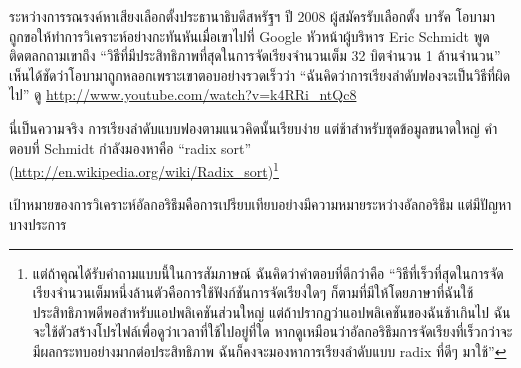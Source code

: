 ระหว่างการรณรงค์หาเสียงเลือกตั้งประธานาธิบดีสหรัฐฯ ปี 2008 ผู้สมัครรับเลือกตั้ง บารัค โอบามา ถูกขอให้ทำการวิเคราะห์อย่างกะทันหันเมื่อเขาไปที่ Google 
หัวหน้าผู้บริหาร Eric Schmidt พูดติดตลกถามเขาถึง ``วิธีที่มีประสิทธิภาพที่สุดในการจัดเรียงจำนวนเต็ม 32 บิตจำนวน 1 ล้านจำนวน'' 
เห็นได้ชัดว่าโอบามาถูกหลอกเพราะเขาตอบอย่างรวดเร็วว่า ``ฉันคิดว่าการเรียงลำดับฟองจะเป็นวิธีที่ผิด ไป'' ดู \url{http://www.youtube.com/watch?v=k4RRi_ntQc8}


นี่เป็นความจริง การเรียงลำดับแบบฟองตามแนวคิดนั้นเรียบง่าย แต่ช้าสำหรับชุดข้อมูลขนาดใหญ่ 
คำตอบที่ Schmidt กำลังมองหาคือ ``radix sort'' (\url{http://en.wikipedia.org/wiki/Radix_sort})\footnote{
แต่ถ้าคุณได้รับคำถามแบบนี้ในการสัมภาษณ์ ฉันคิดว่าคำตอบที่ดีกว่าคือ 
``วิธีที่เร็วที่สุดในการจัดเรียงจำนวนเต็มหนึ่งล้านตัวคือการใช้ฟังก์ชันการจัดเรียงใดๆ ก็ตามที่มีให้โดยภาษาที่ฉันใช้ 
ประสิทธิภาพดีพอสำหรับแอปพลิเคชันส่วนใหญ่ แต่ถ้าปรากฏว่าแอปพลิเคชันของฉันช้าเกินไป 
ฉันจะใช้ตัวสร้างโปรไฟล์เพื่อดูว่าเวลาที่ใช้ไปอยู่ที่ใด หากดูเหมือนว่าอัลกอริธึมการจัดเรียงที่เร็วกว่าจะมีผลกระทบอย่างมากต่อประสิทธิภาพ 
ฉันก็คงจะมองหาการเรียงลำดับแบบ radix ที่ดีๆ มาใช้''}


เป้าหมายของการวิเคราะห์อัลกอริธึมคือการเปรียบเทียบอย่างมีความหมายระหว่างอัลกอริธึม แต่มีปัญหาบางประการ

